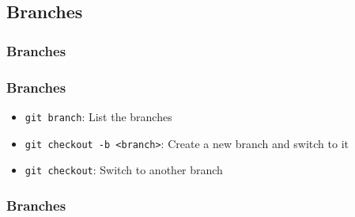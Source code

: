 \documentclass{beamer}
\begin{document}
    \subsection{Branches}\label{subsec:branches}
    \begin{frame}
        \frametitle{Branches}
        \begin{figure}[H]
            \centering
            \noindent
        \end{figure}
    \end{frame}
    \begin{frame}
        \frametitle{Branches}
        \begin{itemize}
            \item \texttt{git branch}: List the branches
            \item \texttt{git checkout -b <branch>}: Create a new branch and switch to it
            \item \texttt{git checkout}: Switch to another branch
        \end{itemize}
    \end{frame}
    \begin{frame}
        \frametitle{Branches}
        \begin{figure}[H]
            \centering
            \noindent
        \end{figure}
    \end{frame}
\end{document}
